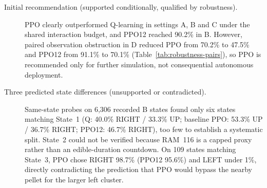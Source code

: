 \begin{description}
  \item[Initial recommendation (supported conditionally, qualified by robustness).]
  PPO clearly outperformed Q-learning in settings A, B and C under the shared interaction
  budget, and PPO12 reached 90.2\% in B. However, paired observation obstruction in D
  reduced PPO from 70.2\% to 47.5\% and PPO12 from 91.1\% to 70.1\% (Table~\ref{tab:robustness-pairs}),
  so PPO is recommended only for further simulation, not consequential autonomous deployment.

  \item[Three predicted state differences (unsupported or contradicted).]
  Same-state probes on 6,306 recorded B states found only six states matching State~1
  (Q: 40.0\% RIGHT / 33.3\% UP; baseline PPO: 53.3\% UP / 36.7\% RIGHT; PPO12: 46.7\% RIGHT),
  too few to establish a systematic split. State~2 could not be verified because RAM~116 is a
  capped proxy rather than an edible-duration countdown. On 109 states matching State~3,
  PPO chose RIGHT 98.7\% (PPO12 95.6\%) and LEFT under 1\%, directly contradicting the
  prediction that PPO would bypass the nearby pellet for the larger left cluster.
\end{description}

